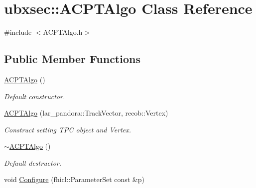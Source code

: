 \hypertarget{classubxsec_1_1ACPTAlgo}{\section{ubxsec\-:\-:A\-C\-P\-T\-Algo Class Reference}
\label{classubxsec_1_1ACPTAlgo}
}


{\ttfamily \#include $<$A\-C\-P\-T\-Algo.\-h$>$}

\subsection*{Public Member Functions}
\begin{DoxyCompactItemize}
\item 
\hypertarget{classubxsec_1_1ACPTAlgo_a68ed88283cbecf205983099237b770db}{\hyperlink{classubxsec_1_1ACPTAlgo_a68ed88283cbecf205983099237b770db}{A\-C\-P\-T\-Algo} ()}\label{classubxsec_1_1ACPTAlgo_a68ed88283cbecf205983099237b770db}

\begin{DoxyCompactList}\small\item\em Default constructor. \end{DoxyCompactList}\item 
\hypertarget{classubxsec_1_1ACPTAlgo_a561896f06ad50c98adc2db24bdb86b88}{\hyperlink{classubxsec_1_1ACPTAlgo_a561896f06ad50c98adc2db24bdb86b88}{A\-C\-P\-T\-Algo} (lar\-\_\-pandora\-::\-Track\-Vector, recob\-::\-Vertex)}\label{classubxsec_1_1ACPTAlgo_a561896f06ad50c98adc2db24bdb86b88}

\begin{DoxyCompactList}\small\item\em Construct setting T\-P\-C object and Vertex. \end{DoxyCompactList}\item 
\hypertarget{classubxsec_1_1ACPTAlgo_a5d275bcfb0b9d3935136d1387e548774}{\hyperlink{classubxsec_1_1ACPTAlgo_a5d275bcfb0b9d3935136d1387e548774}{$\sim$\-A\-C\-P\-T\-Algo} ()}\label{classubxsec_1_1ACPTAlgo_a5d275bcfb0b9d3935136d1387e548774}

\begin{DoxyCompactList}\small\item\em Default destructor. \end{DoxyCompactList}\item 
\hypertarget{classubxsec_1_1ACPTAlgo_a769831f453da3866e53fd99d7b092e7a}{void \hyperlink{classubxsec_1_1ACPTAlgo_a769831f453da3866e53fd99d7b092e7a}{Configure} (fhicl\-::\-Parameter\-Set const \&p)}\label{classubxsec_1_1ACPTAlgo_a769831f453da3866e53fd99d7b092e7a}


\end{DoxyCompactItemize}
